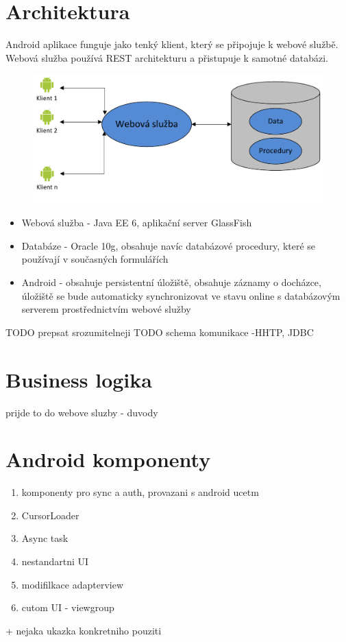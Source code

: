 \documentclass{bakalarka}
\begin{document}
\section{Architektura}
Android aplikace funguje jako tenký klient, který se připojuje k webové službě. Webová služba používá REST architekturu a přistupuje k samotné databázi.

\begin{figure}[H]
  \centering
  \includegraphics[scale=0.8]{obr/souc_arch2.pdf}
  \label{obr: logo zcu}
\end{figure}

\begin{itemize}
\item Webová služba - Java EE 6, aplikační server GlassFish
\item Databáze - Oracle 10g, obsahuje navíc databázové procedury, které se používají v současných formulářích  
\item Android - obsahuje persistentní úložiště, obsahuje záznamy o docházce, úložiště se bude automaticky synchronizovat ve stavu online s databázovým serverem prostřednictvím webové služby
\end{itemize}
TODO prepsat srozumitelneji
TODO schema komunikace -HHTP, JDBC

\section{Business logika}
prijde to do webove sluzby - duvody

\section{Android komponenty}
\begin{enumerate}
\item komponenty pro sync a auth, provazani s android ucetm
\item CursorLoader
\item Async task
\item  nestandartni UI
\item modifilkace adapterview
\item cutom UI - viewgroup
\end{enumerate}
+ nejaka ukazka konkretniho pouziti
\end{document}
